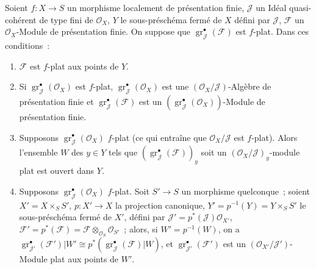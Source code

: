 \begin{proposition}[11.3.4]
Soient $f:X\to S$ un morphisme localement de présentation finie, $\mathcal J$
un Idéal quasi-cohérent de type fini de $\mathcal O_X$, $Y$ le sous-préschéma
fermé de $X$ défini par $\mathcal J$, $\mathcal F$ un $\mathcal O_X$-Module de
présentation finie. On suppose que $\operatorname{gr}_{\mathcal J}^\bullet(\mathcal F)$
est $f$-plat. Dans ces conditions~:
\begin{enumerate}[label=\emph{(\roman*)}]
\item $\mathcal F$ est $f$-plat aux points de $Y$.
\item Si $\operatorname{gr}_{\mathcal J}^\bullet(\mathcal O_X)$ est $f$-plat,
$\operatorname{gr}_{\mathcal J}^\bullet(\mathcal O_X)$ est une
$(\mathcal O_X/\mathcal J)$-Algèbre de présentation finie et
$\operatorname{gr}_{\mathcal J}^\bullet(\mathcal F)$ est un
$(\operatorname{gr}_{\mathcal J}^\bullet(\mathcal O_X))$-Module de présentation
finie.
\item Supposons $\operatorname{gr}_{\mathcal J}^\bullet(\mathcal O_X)$ $f$-plat
(ce qui entraîne que $\mathcal O_X/\mathcal J$ est $f$-plat). Alors l'ensemble
$W$ des $y\in Y$ tels que $(\operatorname{gr}_{\mathcal J}^\bullet(\mathcal F))_y$
soit un $(\mathcal O_X/\mathcal J)_y$-module plat est ouvert dans $Y$.
\item Supposons $\operatorname{gr}_{\mathcal J}^\bullet(\mathcal O_X)$ $f$-plat.
Soit $S'\to S$ un morphisme quelconque~; soient $X'=X\times_SS'$,
$p:X'\to X$ la projection canonique, $Y'=p^{-1}(Y)=Y\times_SS'$ le
sous-préschéma fermé de $X'$, défini par
$\mathcal J'=p^*(\mathcal J)\mathcal O_{X'}$, $\mathcal F'=p^*(\mathcal F)
=\mathcal F\otimes_{\mathcal O_S}\mathcal O_{S'}$~; alors, si
$W'=p^{-1}(W)$, on a
$\operatorname{gr}_{\mathcal J'}^\bullet(\mathcal F')|W'
\cong p^*(\operatorname{gr}_{\mathcal J}^\bullet(\mathcal F)|W)$, et
$\operatorname{gr}_{\mathcal J'}^\bullet(\mathcal F')$ est un
$(\mathcal O_{X'}/\mathcal J')$-Module plat aux points de $W'$.
\end{enumerate}
\end{proposition}


